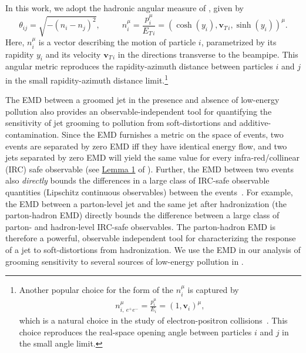 In this work, we adopt the hadronic angular measure of , given by
\begin{equation}
    \theta_{ij} = \sqrt{-(n_i - n_j)^2}
    ,
    ~~~~~~
    ~~~~~~
    n_{i}^\mu = \frac{p_i^\mu}{E_{T\,i}} = (\cosh(y_i), \textbf{v}_{T\,i}, \sinh(y_i))^\mu
    .
    \label{eq:hadronic_metric}
\end{equation}
Here, \(n_i^\mu\) is a vector describing the motion of particle \(i\), parametrized by its rapidity \(y_i\) and its velocity \(\textbf{v}_{T\, i}\) in the directions transverse to the beampipe.
%
This angular metric reproduces the rapidity-azimuth distance between particles \(i\) and \(j\) in the small rapidity-azimuth distance limit.\footnote{
Another popular choice for the form of the \(n_i^\mu\) is captured by
\begin{align}
    \label{eq:ee_metric}
    n_{i,~{e^+e^-}}^\mu = \frac{p_i^\mu}{E_i} = (1, \textbf{v}_i)^\mu
    ,
\end{align}
which is a natural choice in the study of electron-positron collisions~\cite{Komiske:2020qhg}.
%
This choice reproduces the real-space opening angle between particles \(i\) and \(j\) in the small angle limit.
}

The EMD between a groomed jet in the presence and absence of low-energy pollution also provides an observable-independent tool for quantifying the sensitivity of jet grooming to pollution from \glspl{soft-distortion} and \gls{additive-contamination}.
%
Since the EMD furnishes a metric on the space of events, two events are separated by zero EMD iff they have identical energy flow, and two jets separated by zero EMD will yield the same value for every infra-red/collinear (IRC) safe observable (see \href{https://arxiv.org/pdf/2004.04159.pdf#page=11\&zoom=100,0,650}{Lemma 1} of ).
%
Further, the EMD between two events also \textit{directly} bounds the differences in a large class of IRC-safe observable quantities (Lipschitz continuous observables) between the events~\cite{Komiske:2019fks}.
%
For example, the EMD between a parton-level jet and the same jet after \gls{hadronization} (the parton-hadron EMD) directly bounds the difference between a large class of parton- and hadron-level IRC-safe observables.
%
The parton-hadron EMD is therefore a powerful, observable independent tool for characterizing the response of a jet to \glspl{soft-distortion} from \gls{hadronization}.
%
We use the EMD in our analysis of grooming sensitivity to several sources of low-energy pollution in .


